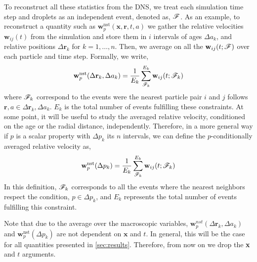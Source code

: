 To reconstruct all these statistics from the DNS, we treat each simulation time step and droplets as an independent event, denoted as, $\mathscr{F}$. 
As an example, to reconstruct a quantity such as $\textbf{w}^\text{nst}_p(\textbf{x},\textbf{r},t,a)$ we gather the relative velocities $\textbf{w}_{ij}(t)$ from the simulation and store them in $i$ intervals of ages $\Delta a_k$, and relative positions $\Delta \textbf{r}_k$ for $k = 1,\ldots, n$.
Then, we average on all the $\textbf{w}_{ij}(t;\mathscr{F})$ over each particle and time step.
Formally, we write, 
\begin{equation}
    \textbf{w}^\text{nst}_p(\Delta\textbf{r}_k,\Delta a_k)
    = \frac{1}{E_k} 
    \sum^{E_k}_{\FF_k} 
    \textbf{w}_{ij}(t;\FF_k)
    \label{eq:vec_cond}
\end{equation}
where $\mathscr{F}_k$ correspond to the events were the nearest particle pair $i$ and $j$ follows $\textbf{r},a \in \Delta \textbf{r}_k ,\Delta a_k$.
$E_k$ is the total number of events fulfilling these constraints. 
At some point, it will be useful to study the averaged relative velocity, conditioned on the age or the radial distance, independently. 
Therefore, in a more general way if $p$ is a scalar property with $\Delta p_k$ its $n$ intervals, we can define the $p$-conditionally averaged relative velocity as, 
\begin{equation}
    \textbf{w}^\text{nst}_p(\Delta p_k)
    = \frac{1}{E_{k}} 
    \sum^{E_{k}}_{\FF_{k}}  
    \textbf{w}_{ij}(t;\FF_k)
    \label{eq:scalar_cond}
\end{equation}
In this definition, $\mathscr{F}_{k}$ corresponds to all the events where the nearest neighbors respect the condition, $p \in \Delta p_k$, and $E_{k}$ represents the total number of events fulfilling this constraint. 

Note that due to the average over the macroscopic variables, $\textbf{w}_p^{nst}(\Delta\textbf{r}_k,\Delta a_k)$ and $\textbf{w}^\text{nst}_p(\Delta p_k)$ are not dependent on $\textbf{x}$ and $t$. 
In general, this will be the case for all quantities presented in \ref{sec:results}. 
Therefore, from now on we drop the \textbf{x} and $t$ arguments. 


